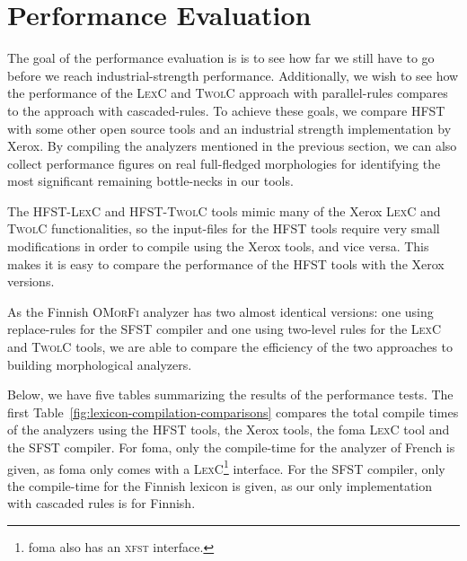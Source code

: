 \documentclass[postprint]{flammie}
\begin{document}
\section{Performance Evaluation}
\label{sec:performance}

The goal of the performance evaluation is is to see how far we still
have to go before we reach industrial-strength performance.
Additionally, we wish to see how the performance of the \textsc{LexC}
and \textsc{TwolC} approach with parallel-rules compares to the
approach with cascaded-rules. To achieve these goals, we compare
\textsc{HFST} with some other open source tools and an industrial
strength implementation by Xerox.  By compiling the analyzers
mentioned in the previous section, we can also collect performance
figures on real full-fledged morphologies for identifying the most
significant remaining bottle-necks in our tools.

The \textsc{HFST-LexC} and \textsc{HFST-TwolC} tools mimic many of the
Xerox \textsc{LexC} and \textsc{TwolC} functionalities, so the
input-files for the \textsc{HFST} tools require very small
modifications in order to compile using the Xerox tools, and vice
versa. This makes it is easy to compare the performance of the
\textsc{HFST} tools with the Xerox versions.

As the Finnish \textsc{OMorFi} analyzer has two almost identical
versions: one using replace-rules for the \textsc{SFST} compiler and
one using two-level rules for the \textsc{LexC} and \textsc{TwolC}
tools, we are able to compare the efficiency of the two approaches to
building morphological analyzers.

Below, we have five tables summarizing the results of the performance
tests. The first Table~\ref{fig:lexicon-compilation-comparisons}
compares the total compile times of the analyzers using the
\textsc{HFST} tools, the Xerox tools, the foma \textsc{LexC} tool and
the \textsc{SFST} compiler.  For foma, only the compile-time for the
analyzer of French is given, as foma only comes with a
\textsc{LexC}\footnote{foma also has an \textsc{xfst} interface.}
interface.  For the \textsc{SFST} compiler, only the compile-time for
the Finnish lexicon is given, as our only implementation with cascaded
rules is for Finnish.
\end{document}
